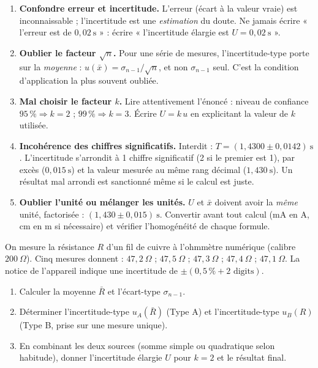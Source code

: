 \documentclass[11pt]{article}
\begin{document}
\begin{attention}
\begin{enumerate}
\item \textbf{Confondre erreur et incertitude.} L'erreur (écart à la valeur vraie) est inconnaissable ; l'incertitude est une \emph{estimation} du doute. Ne jamais écrire « l'erreur est de $0,02\ \text{s}$ » : écrire « l'incertitude élargie est $U = 0,02\ \text{s}$ ».
\item \textbf{Oublier le facteur $\sqrt{n}$.} Pour une série de mesures, l'incertitude-type porte sur la \emph{moyenne} : $u(\bar{x}) = \sigma_{n-1}/\sqrt{n}$, et non $\sigma_{n-1}$ seul. C'est la condition d'application la plus souvent oubliée.
\item \textbf{Mal choisir le facteur $k$.} Lire attentivement l'énoncé : niveau de confiance $95\,\% \Rightarrow k = 2$ ; $99\,\% \Rightarrow k = 3$. Écrire $U = k\,u$ en explicitant la valeur de $k$ utilisée.
\item \textbf{Incohérence des chiffres significatifs.} Interdit : $T = (1,4300 \pm 0,0142)\ \text{s}$. L'incertitude s'arrondit à 1 chiffre significatif (2 si le premier est 1), par excès ($0,015\ \text{s}$) et la valeur mesurée au même rang décimal ($1,430\ \text{s}$). Un résultat mal arrondi est sanctionné même si le calcul est juste.
\item \textbf{Oublier l'unité ou mélanger les unités.} $U$ et $\bar{x}$ doivent avoir la \emph{même} unité, factorisée : $(1,430 \pm 0,015)\ \text{s}$. Convertir avant tout calcul (mA en A, cm en m si nécessaire) et vérifier l'homogénéité de chaque formule.
\end{enumerate}
\end{attention}

\begin{exercice}
On mesure la résistance $R$ d'un fil de cuivre à l'ohmmètre numérique (calibre $200\ \Omega$). Cinq mesures donnent : $47,2\ \Omega$ ; $47,5\ \Omega$ ; $47,3\ \Omega$ ; $47,4\ \Omega$ ; $47,1\ \Omega$. La notice de l'appareil indique une incertitude de $\pm (0,5\,\% + 2 \text{ digits})$.
\begin{enumerate}
\item Calculer la moyenne $\bar{R}$ et l'écart-type $\sigma_{n-1}$.
\item Déterminer l'incertitude-type $u_A(\bar{R})$ (Type A) et l'incertitude-type $u_B(R)$ (Type B, prise sur une mesure unique).
\item En combinant les deux sources (somme simple ou quadratique selon habitude), donner l'incertitude élargie $U$ pour $k=2$ et le résultat final.
\end{enumerate}
\end{exercice}
\end{document}
